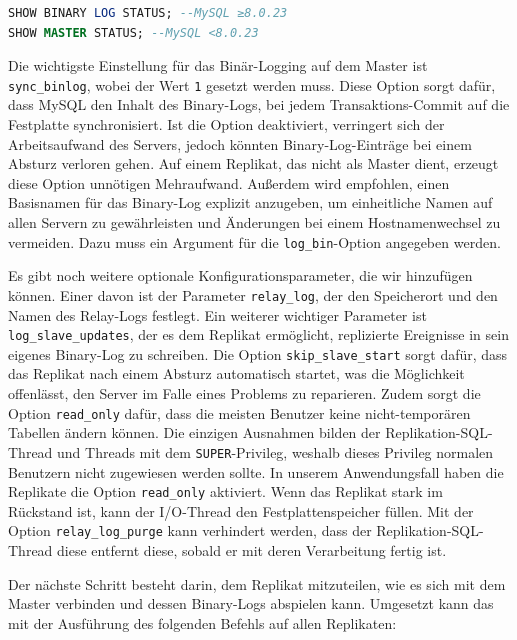 \vspace{-7pt}
\begin{lstlisting}[language=SQL,caption=Anzeige der Konfiguration,label={lst:replication-master-config},style=custom_daniel]
SHOW BINARY LOG STATUS; --MySQL ≥8.0.23
SHOW MASTER STATUS; --MySQL <8.0.23
\end{lstlisting}
\vspace{-5pt}

Die wichtigste Einstellung für das Binär-Logging auf dem Master ist \texttt{sync\_binlog}, wobei der Wert \texttt{1} gesetzt werden muss.
Diese Option sorgt dafür, dass MySQL den Inhalt des Binary-Logs, bei jedem Transaktions-Commit auf die Festplatte synchronisiert.
Ist die Option deaktiviert, verringert sich der Arbeitsaufwand des Servers, jedoch könnten Binary-Log-Einträge bei einem Absturz verloren gehen.
Auf einem Replikat, das nicht als Master dient, erzeugt diese Option unnötigen Mehraufwand.
Außerdem wird empfohlen, einen Basisnamen für das Binary-Log explizit anzugeben, um einheitliche Namen auf allen Servern zu gewährleisten und Änderungen bei einem Hostnamenwechsel zu vermeiden.
Dazu muss ein Argument für die \texttt{log\_bin}-Option angegeben werden.

Es gibt noch weitere optionale Konfigurationsparameter, die wir hinzufügen können.
Einer davon ist der Parameter \texttt{relay\_log}, der den Speicherort und den Namen des Relay-Logs festlegt.
Ein weiterer wichtiger Parameter ist \texttt{log\_slave\_updates}, der es dem Replikat ermöglicht, replizierte Ereignisse in sein eigenes Binary-Log zu schreiben.
Die Option \texttt{skip\_slave\_start} sorgt dafür, dass das Replikat nach einem Absturz automatisch startet, was die Möglichkeit offenlässt, den Server im Falle eines Problems zu reparieren.
Zudem sorgt die Option \texttt{read\_only} dafür, dass die meisten Benutzer keine nicht-temporären Tabellen ändern können.
Die einzigen Ausnahmen bilden der Replikation-SQL-Thread und Threads mit dem \texttt{SUPER}-Privileg, weshalb dieses Privileg normalen Benutzern nicht zugewiesen werden sollte.
In unserem Anwendungsfall haben die Replikate die Option \texttt{read\_only} aktiviert.
Wenn das Replikat stark im Rückstand ist, kann der I/O-Thread den Festplattenspeicher füllen.
Mit der Option \texttt{relay\_log\_purge} kann verhindert werden, dass der Replikation-SQL-Thread diese entfernt diese, sobald er mit deren Verarbeitung fertig ist.

Der nächste Schritt besteht darin, dem Replikat mitzuteilen, wie es sich mit dem Master verbinden und dessen Binary-Logs abspielen kann.
Umgesetzt kann das mit der Ausführung des folgenden Befehls auf allen Replikaten:

